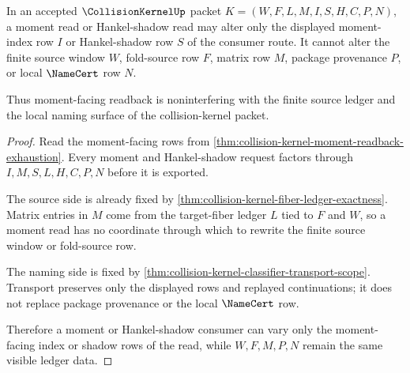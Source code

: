 \begin{theorem}
\label{thm:collision-kernel-moment-ledger-noninterference}
In an accepted $\CollisionKernelUp$ packet $K=(W,F,L,M,I,S,H,C,P,N)$, a moment read or Hankel-shadow read may alter only the displayed moment-index row $I$ or Hankel-shadow row $S$ of the consumer route. It cannot alter the finite source window $W$, fold-source row $F$, matrix row $M$, package provenance $P$, or local $\NameCert$ row $N$.

Thus moment-facing readback is noninterfering with the finite source ledger and the local naming surface of the collision-kernel packet.
\end{theorem}
\begin{proof}
Read the moment-facing rows from \autoref{thm:collision-kernel-moment-readback-exhaustion}. Every moment and Hankel-shadow request factors through $I,M,S,L,H,C,P,N$ before it is exported.

The source side is already fixed by \autoref{thm:collision-kernel-fiber-ledger-exactness}. Matrix entries in $M$ come from the target-fiber ledger $L$ tied to $F$ and $W$, so a moment read has no coordinate through which to rewrite the finite source window or fold-source row.

The naming side is fixed by \autoref{thm:collision-kernel-classifier-transport-scope}. Transport preserves only the displayed rows and replayed continuations; it does not replace package provenance or the local $\NameCert$ row.

Therefore a moment or Hankel-shadow consumer can vary only the moment-facing index or shadow rows of the read, while $W,F,M,P,N$ remain the same visible ledger data.
\end{proof}

